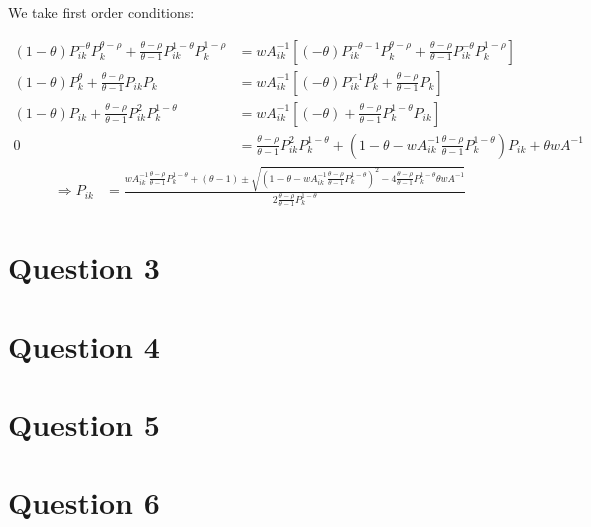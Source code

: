 \documentclass[11pt]{article} %
\begin{document}
We take first order conditions:

\begin{align*}
(1-\theta)P_{ik}^{-\theta} P_k^{\theta - \rho} + \frac{ \theta-\rho}{\theta - 1} P_{ik}^{1-\theta} P_k^{1 - \rho} &= wA_{ik}^{-1}\left[ (-\theta) P_{ik}^{-\theta - 1} P_k^{\theta - \rho} +\frac{ \theta-\rho}{\theta - 1}  P_{ik}^{-\theta} P_k^{1-\rho} \right]\\
(1-\theta) P_k^{\theta } + \frac{ \theta-\rho}{\theta - 1} P_{ik} P_k &= wA_{ik}^{-1}\left[ (-\theta) P_{ik}^{ - 1} P_k^{\theta} +\frac{ \theta-\rho}{\theta - 1}   P_k \right] \\
(1-\theta)P_{ik}  + \frac{ \theta-\rho}{\theta - 1} P_{ik}^2 P_k^{1-\theta} &= wA_{ik}^{-1}\left[ (-\theta)  +\frac{ \theta-\rho}{\theta - 1}   P_k^{1-\theta}P_{ik} \right] \\
0 &= \frac{ \theta-\rho}{\theta - 1} P_{ik}^2 P_k^{1-\theta} + \left(1-\theta  - wA_{ik}^{-1}\frac{ \theta-\rho}{\theta - 1}   P_k^{1-\theta} \right)P_{ik} + \theta wA^{-1}
\end{align*}
\begin{align*}
\Rightarrow P_{ik} &=  \frac{wA_{ik}^{-1}\frac{ \theta-\rho}{\theta - 1}   P_k^{1-\theta}  + (\theta - 1) \pm \sqrt{\left(1-\theta  - wA_{ik}^{-1}\frac{ \theta-\rho}{\theta - 1}   P_k^{1-\theta} \right)^2 - 4\frac{ \theta-\rho}{\theta - 1}  P_k^{1-\theta} \theta wA^{-1}}}{2\frac{ \theta-\rho}{\theta - 1} P_k^{1-\theta}}
\end{align*}
\section{Question 3}
\section{Question 4}
\section{Question 5}
\section{Question 6}
\end{document}
